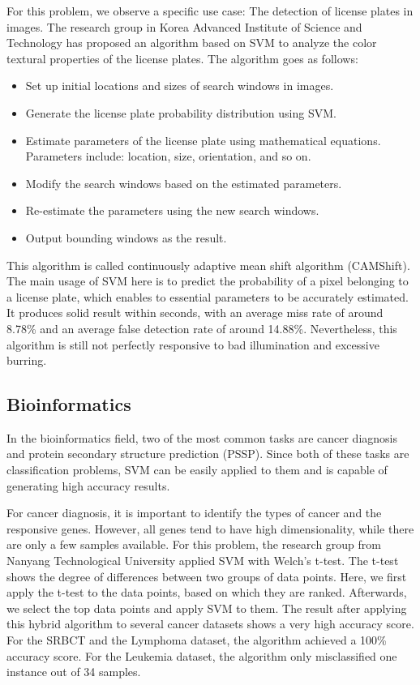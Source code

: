 For this problem, we observe a specific use case: The detection of
license plates in images. The research group in Korea Advanced Institute of 
Science and Technology has proposed an algorithm based on SVM to analyze the 
color textural properties of the license plates. The algorithm goes as
follows:

\begin{itemize}
    \item Set up initial locations and sizes of search windows in images.
    \item Generate the license plate probability distribution using SVM.
    \item Estimate parameters of the license plate using mathematical equations.
    Parameters include: location, size, orientation, and so on.
    \item Modify the search windows based on the estimated parameters.
    \item Re-estimate the parameters using the new search windows.
    \item Output bounding windows as the result.
\end{itemize}

This algorithm is called continuously adaptive mean shift algorithm (CAMShift).
The main usage of SVM here is to predict the probability of a pixel belonging
to a license plate, which enables to essential parameters to be accurately estimated.
It produces solid result within seconds, with an average miss rate of around
8.78\% and an average false detection rate of around 14.88\%.
Nevertheless, this algorithm is still not perfectly responsive to bad illumination
and excessive burring.
\cite{image-classification}

\subsection*{Bioinformatics}
In the bioinformatics field, two of the most common tasks are cancer
diagnosis and protein secondary structure prediction (PSSP). Since both of these
tasks are classification problems, SVM can be easily applied to them and is
capable of generating high accuracy results.

For cancer diagnosis, it is important to identify the types of cancer and the
responsive genes. However, all genes tend to have high dimensionality, while 
there are only a few samples available. For this problem, the research group
from Nanyang Technological University applied SVM with Welch's t-test.
The t-test shows the degree of differences between two groups of data points.
Here, we first apply the t-test to the data points, based on which they are 
ranked. Afterwards, we select the top data points and apply SVM to them.
The result after applying this hybrid algorithm to several cancer datasets 
shows a very high accuracy score. For the SRBCT and the Lymphoma dataset, the
algorithm achieved a 100\% accuracy score. For the Leukemia dataset, the
algorithm only misclassified one instance out of 34 samples.

